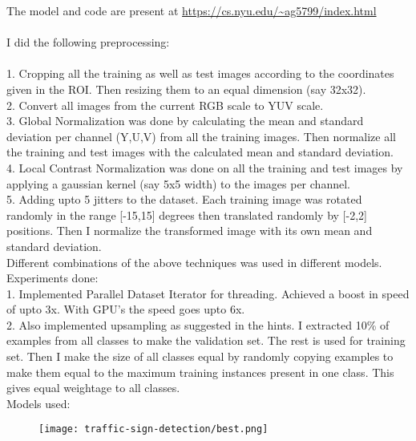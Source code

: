 \documentclass[11pt]{article}
\begin{document}
\maketitle
The model and code are present at \url{https://cs.nyu.edu/~ag5799/index.html} \\\\
I did the following preprocessing:\\\\
1. Cropping all the training as well as test images according to the coordinates given in the ROI. Then resizing them to an equal dimension (say 32x32).\\
2. Convert all images from the current RGB scale to YUV scale. \\
3. Global Normalization was done by calculating the mean and standard deviation per channel (Y,U,V) from all the training images. Then normalize all the training and test images with the calculated mean and standard deviation. \\
4. Local Contrast Normalization was done on all the training and test images by applying a gaussian kernel (say 5x5 width) to the images per channel.\\
5. Adding upto 5 jitters to the dataset. Each training image was rotated randomly in the range [-15,15] degrees then translated randomly by [-2,2] positions. Then I normalize the transformed image with its own mean and standard deviation. \\

Different combinations of the above techniques was used in different models.\\

Experiments done:\\
1. Implemented Parallel Dataset Iterator for threading. Achieved a boost in speed of upto 3x. With GPU's the speed goes upto 6x.\\
2.  Also implemented upsampling as suggested in the hints. I extracted 10\% of examples from all classes to make the validation set. The rest is used for training set. Then I make the size of all classes equal by randomly copying examples to make them equal to the maximum training instances present in one class. This gives equal weightage to all classes. \\

Models used:\\

\begin{figure}[H]
\centering
\texttt{[image: traffic-sign-detection/best.png]}
\caption{ \label{fig1}}
\end{figure}
\end{document}
